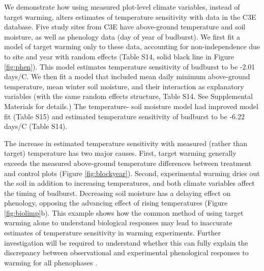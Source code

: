 \documentclass{article}
\begin{document}
\par We demonstrate how using measured plot-level climate variables, instead of target warming, alters estimates of temperature sensitivity with data in the C3E database. Five study sites from C3E have above-ground temperature and soil moisture, as well as phenology data (day of year of budburst). We first fit a model of target warming only to these data, accounting for non-independence due to site and year with random effects (Table S14, solid black line in Figure \ref{fig:phen}). This model estimates temperature sensitivity of budburst to be -2.01 days/\degree C. We then fit a model that included mean daily minimum above-ground temperature, mean winter soil moisture, and their interaction as explanatory variables (with the same random effects structure, Table S14. See Supplemental Materials for details.) The temperature- soil moisture model had improved model fit (Table S15) and estimated temperature sensitivity of budburst to be -6.22 days/\degree C (Table S14). %
\par The increase in estimated temperature sensitivity with measured (rather than target) temperature has two major causes. First, target warming generally exceeds the measured above-ground temperature differences between treatment and control plots (Figure \ref{fig:blockyear}). Second, experimental warming dries out the soil in addition to increasing temperatures, and both climate variables affect the timing of budburst. Decreasing soil moisture has a delaying effect on phenology, opposing the advancing effect of rising temperatures (Figure \ref{fig:biolimp}b). This example shows how the common method of using target warming alone to understand biological responses may lead to inaccurate estimates of temperature sensitivity in warming experiments. Further investigation will be required to understand whether this can fully explain the discrepancy between observational and experimental phenological responses to warming for all phenophases \citep{wolkovich2012}.
\end{document}
